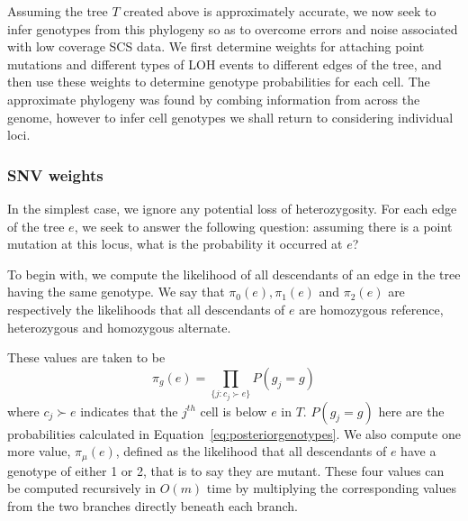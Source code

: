 \documentclass[../../main.tex]{subfiles}
\begin{document}
Assuming the tree $T$ created above is approximately accurate, we now seek to infer genotypes from this phylogeny so as to overcome errors and noise associated with low coverage SCS data.
We first determine weights for attaching point mutations and different types of LOH events to different edges of the tree, and then use these weights to determine genotype probabilities for each cell.
The approximate phylogeny was found by combing information from across the genome, however to infer cell genotypes we shall return to considering individual loci.

\subsubsection*{SNV weights}
In the simplest case, we ignore any potential loss of heterozygosity.
For each edge of the tree $e$, we seek to answer the following question: assuming there is a point mutation at this locus, what is the probability it occurred at $e$?

To begin with, we compute the likelihood of all descendants of an edge in the tree having the same genotype.
We say that $\pi_0(e), \pi_1(e)$ and $\pi_2(e)$ are respectively the likelihoods that all descendants of $e$ are homozygous reference, heterozygous and homozygous alternate.

These values are taken to be
\begin{equation}
\pi_g(e) = \prod_{\{j:c_j\succ e\}} P(g_j = g)
\end{equation}
where $c_j\succ e$ indicates that the $j^{th}$ cell is below $e$ in $T$.
$P(g_j = g)$ here are the probabilities calculated in Equation~\eqref{eq:posteriorgenotypes}.
We also compute one more value, $\pi_\mu(e)$, defined as the likelihood that all descendants of $e$ have a genotype of either 1 or 2, that is to say they are mutant.
These four values can be computed recursively in $O(m)$ time by multiplying the corresponding values from the two branches directly beneath each branch.
\end{document}
